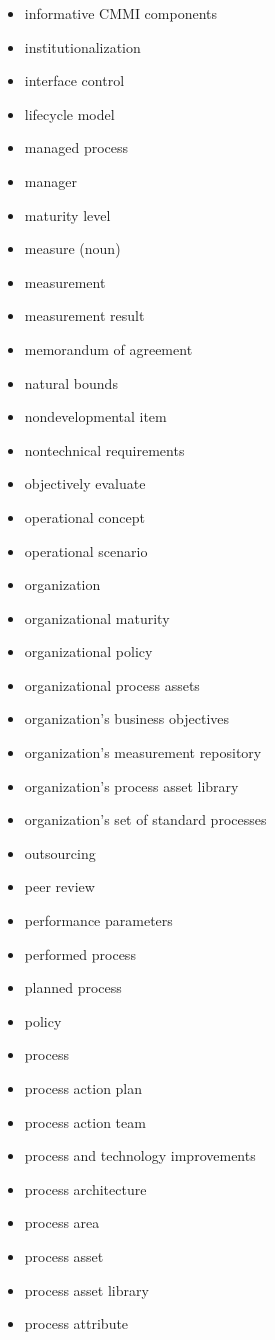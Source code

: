\begin{itemize}
\item informative CMMI components
\item institutionalization
\item interface control
\item lifecycle model
\item managed process
\item manager
\item maturity level
\item measure (noun)
\item measurement
\item measurement result
\item memorandum of agreement
\item natural bounds
\item nondevelopmental item
\item nontechnical requirements
\item objectively evaluate
\item operational concept
\item operational scenario
\item organization
\item organizational maturity
\item organizational policy
\item organizational process assets
\item organization’s business objectives
\item organization’s measurement repository
\item organization’s process asset library
\item organization’s set of standard processes
\item outsourcing
\item peer review
\item performance parameters
\item performed process
\item planned process
\item policy
\item process
\item process action plan
\item process action team
\item process and technology improvements
\item process architecture
\item process area
\item process asset
\item process asset library
\item process attribute

\end{itemize}
